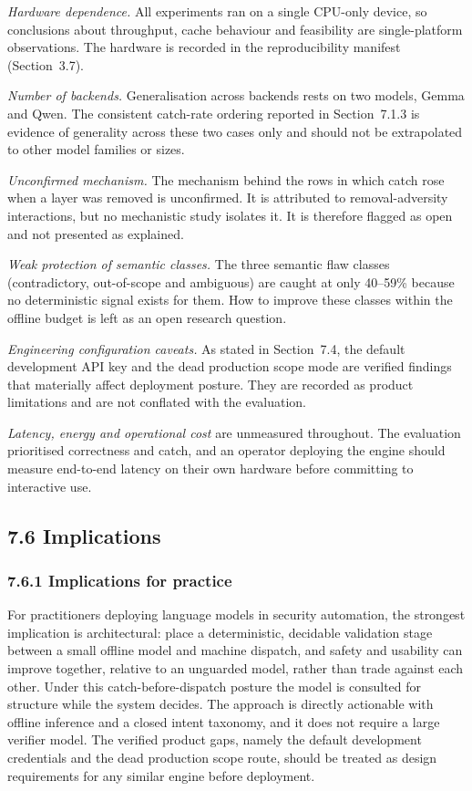 \documentclass[
]{article}
\begin{document}
\emph{Hardware dependence.} All experiments ran on a single CPU-only
device, so conclusions about throughput, cache behaviour and feasibility
are single-platform observations. The hardware is recorded in the
reproducibility manifest (Section~3.7).

\emph{Number of backends.} Generalisation across backends rests on two
models, Gemma and Qwen. The consistent catch-rate ordering reported in
Section~7.1.3 is evidence of generality across these two cases only and
should not be extrapolated to other model families or sizes.

\emph{Unconfirmed mechanism.} The mechanism behind the rows in which
catch rose when a layer was removed is unconfirmed. It is attributed to
removal-adversity interactions, but no mechanistic study isolates it. It
is therefore flagged as open and not presented as explained.

\emph{Weak protection of semantic classes.} The three semantic flaw
classes (contradictory, out-of-scope and ambiguous) are caught at only
40--59\% because no deterministic signal exists for them. How to improve
these classes within the offline budget is left as an open research
question.

\emph{Engineering configuration caveats.} As stated in Section~7.4, the
default development API key and the dead production scope mode are
verified findings that materially affect deployment posture. They are
recorded as product limitations and are not conflated with the
evaluation.

\emph{Latency, energy and operational cost} are unmeasured throughout.
The evaluation prioritised correctness and catch, and an operator
deploying the engine should measure end-to-end latency on their own
hardware before committing to interactive use.

\hypertarget{implications}{%
\subsection{7.6 Implications}\label{implications}}

\hypertarget{implications-for-practice}{%
\subsubsection{7.6.1 Implications for
practice}\label{implications-for-practice}}

For practitioners deploying language models in security automation, the
strongest implication is architectural: place a deterministic, decidable
validation stage between a small offline model and machine dispatch, and
safety and usability can improve together, relative to an unguarded
model, rather than trade against each other. Under this
catch-before-dispatch posture the model is consulted for structure while
the system decides. The approach is directly actionable with offline
inference and a closed intent taxonomy, and it does not require a large
verifier model. The verified product gaps, namely the default
development credentials and the dead production scope route, should be
treated as design requirements for any similar engine before deployment.
\end{document}
